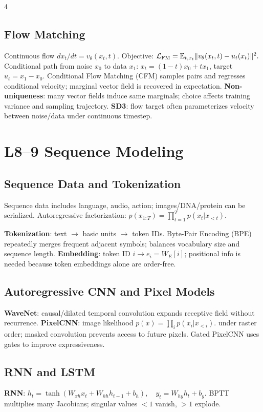 \documentclass{article}
\newcommand{\key}[1]{\textbf{#1}}
\newcommand{\E}{\mathbb{E}}
\newcommand{\1}{\mathbf 1}
\begin{document}
\begin{multicols*}{4}
\subsection{Flow Matching}
Continuous flow $dx_t/dt=v_\theta(x_t,t)$. Objective:
\(
\mathcal L_{\rm FM}=\E_{t,x_t}\|v_\theta(x_t,t)-u_t(x_t)\|^2.
\)
Conditional path from noise $x_0$ to data $x_1$: $x_t=(1-t)x_0+tx_1$, target $u_t=x_1-x_0$. Conditional Flow Matching (CFM) samples pairs and regresses conditional velocity; marginal vector field is recovered in expectation. \key{Non-uniqueness}: many vector fields induce same marginals; choice affects training variance and sampling trajectory. \key{SD3}: flow target often parameterizes velocity between noise/data under continuous timestep.

\section{L8--9 Sequence Modeling}
\subsection{Sequence Data and Tokenization}
Sequence data includes language, audio, action; images/DNA/protein can be serialized. Autoregressive factorization:
\(
p(x_{1:T})=\prod_{t=1}^T p(x_t|x_{<t}).
\)

\key{Tokenization}: text $\to$ basic units $\to$ token IDs. Byte-Pair Encoding (BPE) repeatedly merges frequent adjacent symbols; balances vocabulary size and sequence length. \key{Embedding}: token ID $i\to e_i=W_E[i]$; positional info is needed because token embeddings alone are order-free.

\subsection{Autoregressive CNN and Pixel Models}
\key{WaveNet}: causal/dilated temporal convolution expands receptive field without recurrence. \key{PixelCNN}: image likelihood
\(
p(x)=\prod_i p(x_i|x_{<i}). 
\)
under raster order; masked convolution prevents access to future pixels. Gated PixelCNN uses gates to improve expressiveness.

\subsection{RNN and LSTM}
\key{RNN}:
\(
h_t=\tanh(W_{xh}x_t+W_{hh}h_{t-1}+b_h),\quad y_t=W_{hy}h_t+b_y.
\)
BPTT multiplies many Jacobians; singular values $<1$ vanish, $>1$ explode. 


\end{multicols*}
\end{document}

